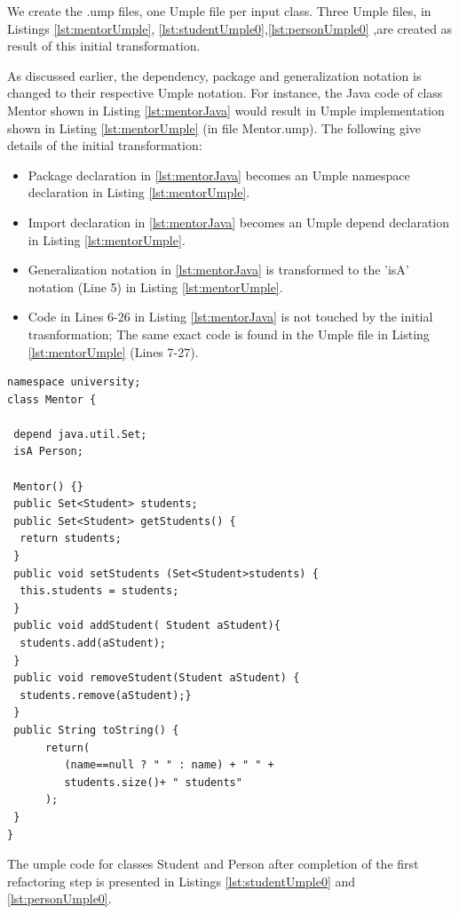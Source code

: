 We create the .ump files, one Umple file per input class. Three Umple files, in Listings \ref{lst:mentorUmple}, \ref{lst:studentUmple0},\ref{lst:personUmple0} ,are created as result of this initial transformation. 


As discussed earlier, the dependency, package and generalization notation is changed to their respective Umple notation. For instance, the Java code of class Mentor shown in Listing \ref{lst:mentorJava} would result in  Umple implementation shown in Listing  \ref{lst:mentorUmple} (in file Mentor.ump). The following give details of the initial transformation:

\begin{itemize}
\item Package declaration in \ref{lst:mentorJava} becomes an Umple namespace declaration in Listing \ref{lst:mentorUmple}.
\item Import declaration in \ref{lst:mentorJava} becomes an Umple depend declaration in Listing \ref{lst:mentorUmple}.
\item Generalization notation in \ref{lst:mentorJava} is transformed to the 'isA' notation (Line 5) in Listing \ref{lst:mentorUmple}.
\item Code in Lines 6-26 in Listing \ref{lst:mentorJava} is not touched by the initial trasnformation; The same exact code is found in the Umple file in Listing \ref{lst:mentorUmple} (Lines 7-27).
\end{itemize}

\begin{lstlisting}[style=UmpleIn,caption=Mentor.ump,label=lst:mentorUmple]
namespace university;
class Mentor { 

 depend java.util.Set;
 isA Person;
 
 Mentor() {}
 public Set<Student> students;
 public Set<Student> getStudents() {
  return students; 
 } 
 public void setStudents (Set<Student>students) { 
  this.students = students;
 } 
 public void addStudent( Student aStudent){
  students.add(aStudent); 
 }
 public void removeStudent(Student aStudent) {
  students.remove(aStudent);} 
 } 
 public String toString() {
      return(
         (name==null ? " " : name) + " " +
         students.size()+ " students"
      );
 }
}
\end{lstlisting}

The umple code for classes Student and Person after completion of the first refactoring step is presented in Listings \ref{lst:studentUmple0} and \ref{lst:personUmple0}. 

